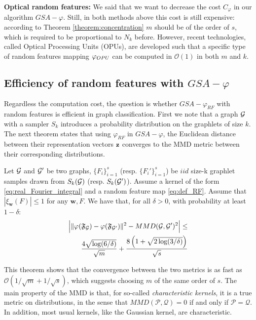 \documentclass{article}
\begin{document}
\textbf{Optical random features:} We said that we want to decrease the cost $C_\varphi$ in our algorithm $GSA-\varphi$. Still, in both methods above this cost is still expensive: according to Theorem \ref{theorem:concentration} $m$ should be of the order of $s$, which is required to be proportional to $N_k$ before. However, recent technologies, called Optical Processing Units (OPUs), are developed such that a specific type of random features mapping $\varphi_{OPU}$ can be computed in $\mathcal{O}(1)$ in both $m$ and $k$. 

\subsection{Efficiency of random features with $GSA-\varphi$} 
\label{sec:MMD}
Regardless the computation cost, the question is whether $GSA-\varphi_{RF}$ with random features is efficient in graph classification. First we note that a graph $\mathcal{G}$ with a sampler $S_k$ introduces a probability distribution on the graphlets of size $k$. The next theorem states that using $\varphi_{RF}$ in $GSA-\varphi$, the Euclidean distance between their representation vectors $\mathbf{z}$ converges to the MMD metric between their corresponding distributions. 
\begin{theorem}
\label{theorem:concentration}
Let $\mathcal{G}$ and $\mathcal{G}'$ be two graphs, $\{F_i\}_{i=1}^{s}$ (resp. $\{F_i'\}_{i=1}^{s}$) be $iid$ size-k graphlet samples drawn from $S_k(\mathcal{G})$ (resp. $S_k(\mathcal{G}')$). Assume a kernel of the form \ref{eq:real_Fourier_integral} and a random feature map \ref{eq:def_RF}. Assume that $|\xi_\mathbf{w}(F)| \leq 1$ for any $\mathbf{w},F$.
We have that, for all $\delta>0$, with probability at least $1-\delta$:
\begin{align*}
 \Big|\|\varphi(\mathfrak{F}_{\mathcal{G}}) - \varphi(\mathfrak{F}_{\mathcal{G}'})\|^2 - MMD(\mathcal{G},\mathcal{G}')^2 \Big| \leq \\\frac{4 \sqrt{\log (6/\delta)}}{\sqrt{m}} + \frac{8\left(1+\sqrt{2\log(3/\delta)}\right)}{\sqrt{{s}}}
\end{align*}
\end{theorem}

This theorem shows that the convergence between the two metrics is as fast as $\mathcal{O}(1/\sqrt{m}+1/\sqrt{s})$, which suggests choosing $m$ of the same order of $s$.
The main property of the MMD is that, for so-called \emph{characteristic kernels}, it is a true metric on distributions, in the sense that $MMD(\mathcal{P}, \mathcal{Q}) = 0$ if and only if $\mathcal{P} = \mathcal{Q}$. In addition, most usual kernels, like the Gaussian kernel, are characteristic.
\end{document}
